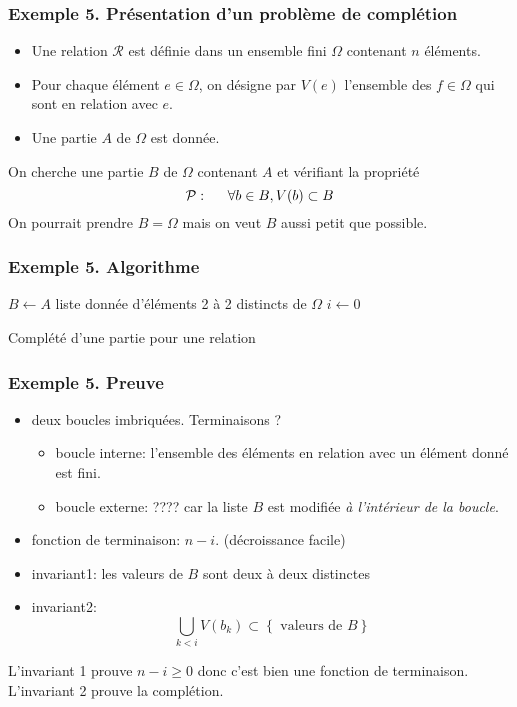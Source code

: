 \begin{frame}
  \frametitle{Exemple 5. Présentation d'un problème de \og complétion\fg~}
\begin{itemize}
  \item Une relation $\mathcal{R}$ est définie dans un ensemble fini $\Omega$ contenant $n$ éléments.
  \item Pour chaque élément $e\in \Omega$, on désigne par $V(e)$ l'ensemble des $f\in \Omega$ qui sont en relation avec $e$.
  \item Une partie $A$ de $\Omega$ est donnée.
\end{itemize}
 On cherche une partie $B$ de $\Omega$ contenant $A$ et vérifiant la propriété
\begin{displaymath}
  \mathcal{P}: \hspace{0.5cm} \forall b \in B, V(b) \subset B
\end{displaymath}
On pourrait prendre $B=\Omega$ mais on veut $B$ aussi petit que possible.
\end{frame}

\begin{frame}
  \frametitle{Exemple 5. Algorithme}
\begin{algorithm}[H]
  $B \leftarrow A$ liste donnée d'éléments 2 à 2 distincts de $\Omega$\;
  $i \leftarrow 0$\;
  \caption{Complété d'une partie pour une relation}
\end{algorithm}
\end{frame}

\begin{frame}
  \frametitle{Exemple 5. Preuve}
\begin{itemize}
  \item deux boucles imbriquées. Terminaisons ?
  \begin{itemize}
    \item boucle interne: l'ensemble des éléments en relation avec un élément donné est fini.
    \item boucle externe: ???? car la liste $B$ est modifiée \emph{à l'intérieur de la boucle}.
  \end{itemize}
  \item fonction de terminaison: $n-i$. (décroissance facile)
  \item invariant1: \og les valeurs de $B$ sont deux à deux distinctes\fg~
  \item invariant2:
\begin{displaymath}
  \bigcup_{k< i}V(b_k) \subset \left\lbrace \text{ valeurs de }B \right\rbrace 
\end{displaymath}

\end{itemize}
L'invariant 1 prouve $n-i \geq 0$ donc c'est bien une fonction de terminaison. L'invariant 2 prouve la complétion.
\end{frame}




